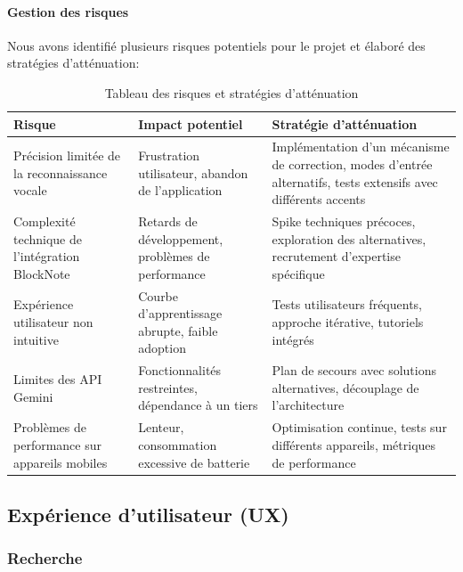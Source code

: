 \paragraph{Gestion des risques}
    
    Nous avons identifié plusieurs risques potentiels pour le projet et élaboré des stratégies d'atténuation:
    
    \begin{table}[H]
    \centering
    \begin{tabular}{|p{3cm}|p{5cm}|p{5cm}|}
    \hline
    \textbf{Risque} & \textbf{Impact potentiel} & \textbf{Stratégie d'atténuation} \\
    \hline
    Précision limitée de la reconnaissance vocale & Frustration utilisateur, abandon de l'application & Implémentation d'un mécanisme de correction, modes d'entrée alternatifs, tests extensifs avec différents accents \\
    \hline
    Complexité technique de l'intégration BlockNote & Retards de développement, problèmes de performance & Spike techniques précoces, exploration des alternatives, recrutement d'expertise spécifique \\
    \hline
    Expérience utilisateur non intuitive & Courbe d'apprentissage abrupte, faible adoption & Tests utilisateurs fréquents, approche itérative, tutoriels intégrés \\
    \hline
    Limites des API Gemini & Fonctionnalités restreintes, dépendance à un tiers & Plan de secours avec solutions alternatives, découplage de l'architecture \\
    \hline
    Problèmes de performance sur appareils mobiles & Lenteur, consommation excessive de batterie & Optimisation continue, tests sur différents appareils, métriques de performance \\
    \hline
    \end{tabular}
    \caption{Tableau des risques et stratégies d'atténuation}
    \label{tab:risk_management}
    \end{table}
    
    \subsection{Expérience d'utilisateur (UX)}
    
    \subsubsection{Recherche}
    
